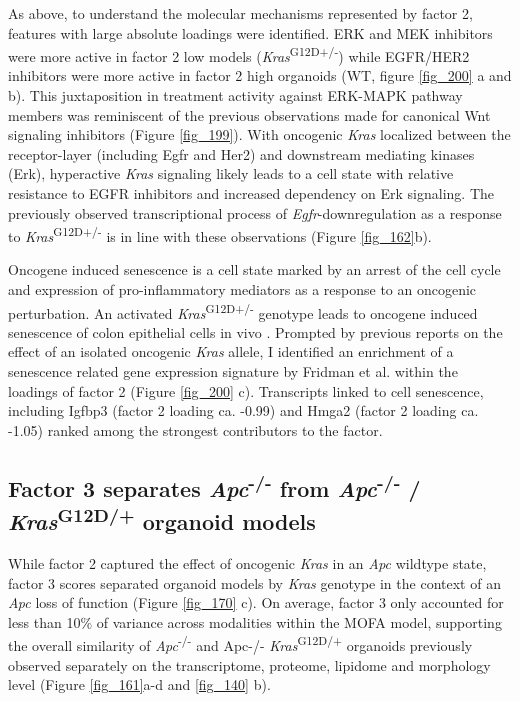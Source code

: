 \begin{flushleft}
As above, to understand the molecular mechanisms represented by factor 2, features with large absolute loadings were identified. ERK and MEK inhibitors were more active in factor 2 low models (\textit{Kras}\textsuperscript{G12D+/-}) while EGFR/HER2 inhibitors were more active in factor 2 high organoids (WT, figure \ref{fig_200} a and b). This juxtaposition in treatment activity against ERK-MAPK pathway members was reminiscent of the previous observations made for canonical Wnt signaling inhibitors (Figure \ref{fig_199}). With oncogenic \textit{Kras} localized between the receptor-layer (including Egfr and Her2) and downstream mediating kinases (Erk), hyperactive \textit{Kras} signaling likely leads to a cell state with relative resistance to EGFR inhibitors and increased dependency on Erk signaling. The previously observed transcriptional process of \textit{Egfr}-downregulation as a response to \textit{Kras}\textsuperscript{G12D+/-} is in line with these observations (Figure \ref{fig_162}b). 

\bigbreak
Oncogene induced senescence is a cell state marked by an arrest of the cell cycle and expression of pro-inflammatory mediators as a response to an oncogenic perturbation. An activated \textit{Kras}\textsuperscript{G12D+/-} genotype leads to oncogene induced senescence of colon epithelial cells in vivo \parencite{benneckeInk4aArfOncogeneinduced2010}. Prompted by previous reports on the effect of an isolated oncogenic \textit{Kras} allele, I identified an enrichment of a senescence related gene expression signature by Fridman et al. within the loadings of factor 2 \parencite{fridmanCriticalPathwaysCellular2008} (Figure \ref{fig_200} c). Transcripts linked to cell senescence, including Igfbp3 (factor 2 loading ca. -0.99) and Hmga2 (factor 2 loading ca. -1.05) ranked among the strongest contributors to the factor. 
\bigbreak


\clearpage
\subsection{Factor 3 separates \textit{Apc}\textsuperscript{-/-} from \textit{Apc}\textsuperscript{-/-} / \textit{Kras}\textsuperscript{G12D/+} organoid models}

While factor 2 captured the effect of oncogenic \textit{Kras} in an \textit{Apc} wildtype state, factor 3 scores separated organoid models by \textit{Kras} genotype in the context of an \textit{Apc} loss of function (Figure \ref{fig_170} c). On average, factor 3 only accounted for less than 10\% of variance across modalities within the MOFA model, supporting the overall similarity of \textit{Apc}\textsuperscript{-/-}  and Apc-/- \textit{Kras}\textsuperscript{G12D/+} organoids previously observed separately on the transcriptome, proteome, lipidome and morphology level (Figure \ref{fig_161}a-d and \ref{fig_140} b).


\end{flushleft}
